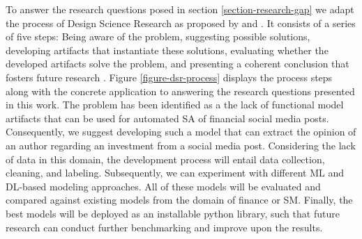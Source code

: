 To answer the research questions posed in section \ref{section-research-gap} we adapt the process of Design Science Research as proposed by  and . It consists of a series of five steps: Being aware of the problem, suggesting possible solutions, developing artifacts that instantiate these solutions, evaluating whether the developed artifacts solve the problem, and presenting a coherent conclusion that fosters future research \cite{kuechler2012dsrprocess}. Figure \ref{figure-dsr-process} displays the process steps along with the concrete application to answering the research questions presented in this work.\newline
The problem has been identified as a the lack of functional model artifacts that can be used for automated SA of financial social media posts. Consequently, we suggest developing such a model that can extract the opinion of an author regarding an investment from a social media post. Considering the lack of data in this domain, the development process will entail data collection, cleaning, and labeling. Subsequently, we can experiment with different ML and DL-based modeling approaches. All of these models will be evaluated and compared against existing models from the domain of finance or SM. Finally, the best models will be deployed as an installable python library, such that future research can conduct further benchmarking and improve upon the results.













